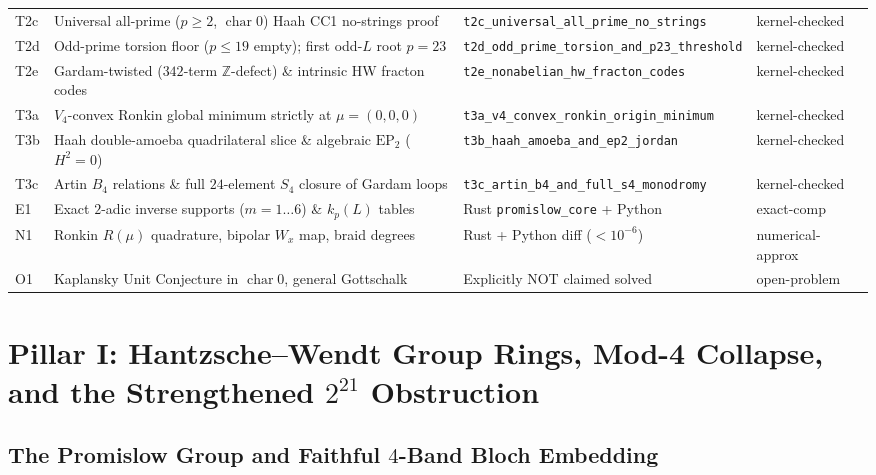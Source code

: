 \documentclass[11pt,reqno]{amsart}
\theoremstyle{definition}
\newcommand{\Z}{\mathbb{Z}}
\newcommand{\tierK}{\textsf{\scriptsize\textcolor{accentgreen}{kernel-checked}}}
\newcommand{\tierE}{\textsf{\scriptsize\textcolor{accentblue}{exact-comp}}}
\newcommand{\tierN}{\textsf{\scriptsize\textcolor{accentorange}{numerical-approx}}}
\newcommand{\tierO}{\textsf{\scriptsize\textcolor{accentpurple}{open-problem}}}
\begin{document}
\begin{table}[htbp]
\begin{tabularx}{\textwidth}{@{}l>{\raggedright\arraybackslash}X>{\raggedright\arraybackslash}p{4.35cm}l@{}}
\textsf{T2c} & Universal all-prime ($p \ge 2$, $\operatorname{char} 0$) Haah CC1 no-strings proof & \texttt{t2c\_universal\_all\_}\newline\texttt{prime\_no\_strings} & \tierK{} \\
\textsf{T2d} & Odd-prime torsion floor ($p \le 19$ empty); first odd-$L$ root $p=23$ & \texttt{t2d\_odd\_prime\_torsion\_}\newline\texttt{and\_p23\_threshold} & \tierK{} \\
\textsf{T2e} & Gardam-twisted ($342$-term $\Z$-defect) \& intrinsic HW fracton codes & \texttt{t2e\_nonabelian\_hw\_}\newline\texttt{fracton\_codes} & \tierK{} \\
\textsf{T3a} & $V_4$-convex Ronkin global minimum strictly at $\mu = (0,0,0)$ & \texttt{t3a\_v4\_convex\_ronkin\_}\newline\texttt{origin\_minimum} & \tierK{} \\
\textsf{T3b} & Haah double-amoeba quadrilateral slice \& algebraic $\mathrm{EP}_2$ ($H^2=0$) & \texttt{t3b\_haah\_amoeba\_}\newline\texttt{and\_ep2\_jordan} & \tierK{} \\
\textsf{T3c} & Artin $B_4$ relations \& full $24$-element $S_4$ closure of Gardam loops & \texttt{t3c\_artin\_b4\_and\_}\newline\texttt{full\_s4\_monodromy} & \tierK{} \\
\midrule
\textsf{E1} & Exact $2$-adic inverse supports ($m=1\dots 6$) \& $k_p(L)$ tables & Rust \texttt{promislow\_core} + Python & \tierE{} \\
\textsf{N1} & Ronkin $R(\mu)$ quadrature, bipolar $W_x$ map, braid degrees & Rust + Python diff ($<10^{-6}$) & \tierN{} \\
\textsf{O1} & Kaplansky Unit Conjecture in $\operatorname{char} 0$, general Gottschalk & Explicitly NOT claimed solved & \tierO{} \\
\bottomrule
\end{tabularx}
\end{table}

\section{Pillar I: Hantzsche--Wendt Group Rings, Mod-4 Collapse, and the Strengthened $2^{21}$ Obstruction}
\label{sec:pillar1}

\subsection{The Promislow Group and Faithful $4$-Band Bloch Embedding}
\end{document}
